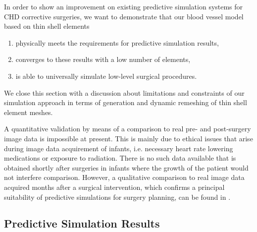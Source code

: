 In order to show an improvement on existing predictive simulation systems for CHD corrective surgeries, we want to demonstrate that our blood vessel model based on thin shell elements
\begin{enumerate}
\item physically meets the requirements for predictive simulation results,
\item converges to these results with a low number of elements,
\item is able to universally simulate low-level surgical procedures.
\end{enumerate}
We close this section with a discussion about limitations and constraints of our simulation approach in terms of generation and dynamic remeshing of thin shell element meshes.

A quantitative validation by means of a comparison to real pre- and post-surgery image data is impossible at present. This is mainly due to ethical issues that arise during image data acquirement of infants, i.e. necessary heart rate lowering medications or exposure to radiation. There is no such data available that is obtained shortly after surgeries in infants where the growth of the patient would not interfere comparison. However, a qualitative comparison to real image data acquired months after a surgical intervention, which confirms a principal suitability of predictive simulations for surgery planning, can be found in \cite{Li2009}.

\subsection{Predictive Simulation Results}

